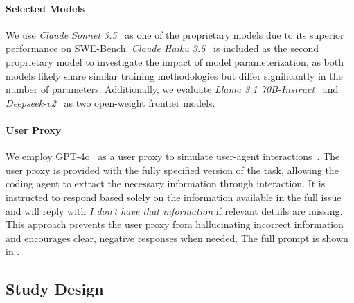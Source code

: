\paragraph{Selected Models} We use \textit{Claude Sonnet 3.5}~\cite{anthropic2024claudesonnet} as one of the proprietary models due to its superior performance on SWE-Bench. \textit{Claude Haiku 3.5}~\cite{anthropic2024claude35haiku} is included as the second proprietary model to investigate the impact of model parameterization, as both models likely share similar training methodologies but differ significantly in the number of parameters. Additionally, we evaluate \textit{Llama 3.1 70B-Instruct}~\cite{llama3} and \textit{Deepseek-v2}~\cite{deepseekv2} as two open-weight frontier models.

\paragraph{User Proxy} We employ GPT-4o~\cite{openai2024gpt4o} as a user proxy to simulate user-agent interactions~\cite{xu2024theagentcompanybenchmarkingllmagents, zhou2024haicosystem}. The user proxy is provided with the fully specified version of the task, allowing the coding agent to extract the necessary information through interaction. It is instructed to respond based solely on the information available in the full issue and will reply with \textit{I don't have that information} if relevant details are missing. This approach prevents the user proxy from hallucinating incorrect information and encourages clear, negative responses when needed. The full prompt is shown in .
\FloatBarrier

\subsection{Study Design}


